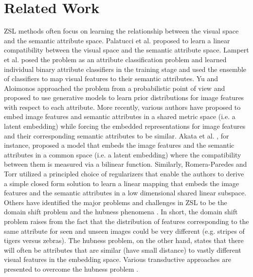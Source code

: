\documentclass[letterpaper]{article} %
\begin{document}
\section{Related Work}     


ZSL methods often focus on learning the relationship between the visual space and the semantic attribute space. Palatucci et al. \cite{palatucci2009zero} proposed to learn a linear compatibility between the visual space and the semantic attribute space. Lampert et al. \cite{lampert2014attribute} posed the problem as an attribute classification problem and learned individual binary  attribute classifiers in the training stage and used the ensemble of classifiers to map visual features to their  semantic attributes.   
Yu  and Aloimonos \cite{yu2010attribute} approached the problem from a probabilistic point of view and proposed to use generative models to learn prior distributions for image features with respect to each attribute. More recently,  various authors have proposed to embed image features and semantic attributes in a shared metric space (i.e. a latent embedding) \cite{akata2013label,romera2015embarrassingly,zhang2015zero} while  forcing the embedded representations for image features and their corresponding semantic attributes to be similar.  Akata et al. \cite{akata2013label}, for instance,  proposed a model that embeds the image features and the semantic attributes in a common space   (i.e. a latent embedding) where the compatibility between them is measured via a bilinear function.   Similarly, Romera-Paredes and Torr \cite{romera2015embarrassingly} utilized a principled choice of regularizers that enable the authors to derive a simple closed form solution to learn a linear mapping that embeds the image features and the semantic attributes in a low dimensional shared linear subspace.  Others have identified the major problems and challenges in ZSL to be the domain shift problem \cite{kodirov2015unsupervised} and the hubness phenomena \cite{dinu2014improving,shigeto2015ridge}. In short, the domain shift problem raises from the fact that the distribution of features corresponding to the same attribute for seen and unseen images could be very different (e.g. stripes of tigers versus zebras). The hubness problem, on the other hand, states that there will often be attributes that are similar (have small distance) to vastly different visual features in the embedding space.  Various transductive approaches are presented to overcome the hubness problem \cite{fu2015transductive,yu2017transductive}.
\end{document}

